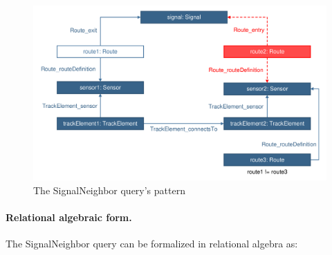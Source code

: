 % 
%   
%   
%   

\begin{figure}[Htb]
		\centering
		\includegraphics[scale=0.4]{figures/trainbenchmark-signalneighbor}
		\caption{The \textsf{SignalNeighbor} query's pattern}
		\label{fig:trainbenchmark-signalneighbor}
\end{figure}

\paragraph{Relational algebraic form.} The \textsf{SignalNeighbor} query can be formalized in relational algebra as:

